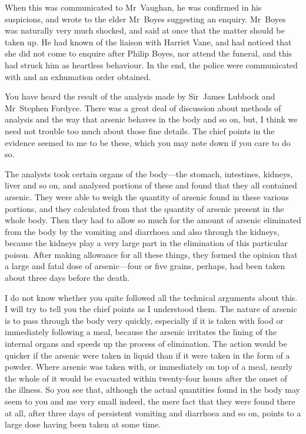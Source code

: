 When this was communicated to Mr~Vaughan, he was confirmed in his suspicions, and wrote to the elder Mr~Boyes suggesting an enquiry. Mr~Boyes was naturally very much shocked, and said at once that the matter should be taken up. He had known of the liaison with Harriet Vane, and had noticed that she did not come to enquire after Philip Boyes, nor attend the funeral, and this had struck him as heartless behaviour. In the end, the police were communicated with and an exhumation order obtained.

You have heard the result of the analysis made by Sir~James Lubbock and Mr~Stephen Fordyce. There was a great deal of discussion about methods of analysis and the way that arsenic behaves in the body and so on, but, I think we need not trouble too much about those fine details. The chief points in the evidence seemed to me to be these, which you may note down if you care to do so.

The analysts took certain organs of the body—the stomach, intestines, kidneys, liver and so on, and analysed portions of these and found that they all contained arsenic. They were able to weigh the quantity of arsenic found in these various portions, and they calculated from that the quantity of arsenic present in the whole body. Then they had to allow so much for the amount of arsenic eliminated from the body by the vomiting and diarrhoea and also through the kidneys, because the kidneys play a very large part in the elimination of this particular poison. After making allowance for all these things, they formed the opinion that a large and fatal dose of arsenic—four or five grains, perhaps, had been taken about three days before the death.

I do not know whether you quite followed all the technical arguments about this. I will try to tell you the chief points as I understood them. The nature of arsenic is to pass through the body very quickly, especially if it is taken with food or immediately following a meal, because the arsenic irritates the lining of the internal organs and speeds up the process of elimination. The action would be quicker if the arsenic were taken in liquid than if it were taken in the form of a powder. Where arsenic was taken with, or immediately on top of a meal, nearly the whole of it would be evacuated within twenty-four hours after the onset of the illness. So you see that, although the actual quantities found in the body may seem to you and me very small indeed, the mere fact that they were found there at all, after three days of persistent vomiting and diarrhoea and so on, points to a large dose having been taken at some time.

